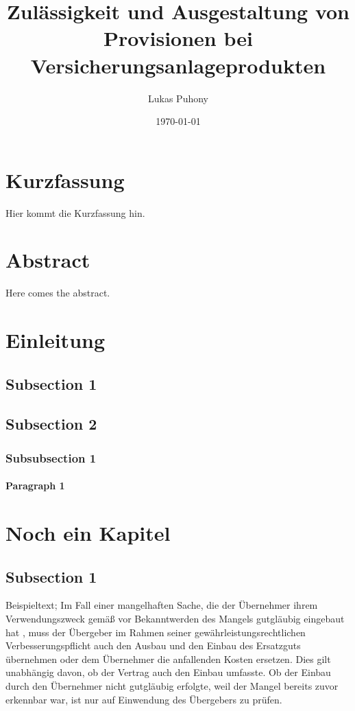 \documentclass[a4paper, 12pt]{article}
\title{Zulässigkeit und Ausgestaltung von Provisionen bei Versicherungsanlageprodukten}
\author{Lukas Puhony}
\date{\today}
\begin{document}


\section*{Kurzfassung}

Hier kommt die Kurzfassung hin.

\newpage

\section*{Abstract}

Here comes the abstract.

\newpage
{}

\tableofcontents
\newpage

\section{Einleitung}
\subsection{Subsection 1}
\subsection{Subsection 2}
\subsubsection{Subsubsection 1}
\paragraph{Paragraph 1}

\section{Noch ein Kapitel}
\subsection{Subsection 1}

Beispieltext; Im Fall einer mangelhaften Sache, die der Übernehmer ihrem Verwendungszweck gemäß vor Bekanntwerden des Mangels gutgläubig eingebaut hat , muss der Übergeber im Rahmen seiner gewährleistungsrechtlichen Verbesserungspflicht  auch den Ausbau und den Einbau des Ersatzguts übernehmen oder dem Übernehmer die anfallenden Kosten ersetzen. Dies gilt unabhängig davon, ob der Vertrag auch den Einbau umfasste. Ob der Einbau durch den Übernehmer nicht gutgläubig erfolgte, weil der Mangel bereits zuvor erkennbar war, ist nur auf Einwendung des Übergebers zu prüfen.
\end{document}
